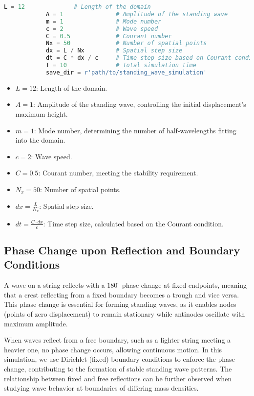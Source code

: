 \documentclass{article}
\begin{document}
		 \begin{lstlisting}[language=Python]
		 	L = 12              # Length of the domain
		 	A = 1               # Amplitude of the standing wave
		 	m = 1               # Mode number
		 	c = 2               # Wave speed
		 	C = 0.5             # Courant number
		 	Nx = 50             # Number of spatial points
		 	dx = L / Nx         # Spatial step size
		 	dt = C * dx / c     # Time step size based on Courant condition
		 	T = 10              # Total simulation time
		 	save_dir = r'path/to/standing_wave_simulation'
		 \end{lstlisting}
		 
		 \begin{itemize}
		 	\item \( L = 12 \): Length of the domain.
		 	\item \( A = 1 \): Amplitude of the standing wave, controlling the initial displacement's maximum height.
		 	\item \( m = 1 \): Mode number, determining the number of half-wavelengths fitting into the domain.
		 	\item \( c = 2 \): Wave speed.
		 	\item \( C = 0.5 \): Courant number, meeting the stability requirement.
		 	\item \( N_x = 50 \): Number of spatial points.
		 	\item \( dx = \frac{L}{N_x} \): Spatial step size.
		 	\item \( dt = \frac{C \cdot dx}{c} \): Time step size, calculated based on the Courant condition.
		 \end{itemize}
		 
		 \subsection{Phase Change upon Reflection and Boundary Conditions}
		 
		 A wave on a string reflects with a \(180^\circ\) phase change at fixed endpoints, meaning that a crest reflecting from a fixed boundary becomes a trough and vice versa. This phase change is essential for forming standing waves, as it enables nodes (points of zero displacement) to remain stationary while antinodes oscillate with maximum amplitude.
		 
		 When waves reflect from a free boundary, such as a lighter string meeting a heavier one, no phase change occurs, allowing continuous motion. In this simulation, we use Dirichlet (fixed) boundary conditions to enforce the phase change, contributing to the formation of stable standing wave patterns. The relationship between fixed and free reflections can be further observed when studying wave behavior at boundaries of differing mass densities.
		 
\end{document}
